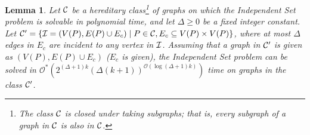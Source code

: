 \documentclass[11pt]{article}
\newtheorem{lemma}[theorem]{Lemma}
\newcommand{\Oh}{{\mathcal O}}
\newcommand{\Ohstar}{{\mathcal O^{*}}}
\begin{document}
\begin{lemma}\label{lem:separation}
Let ${\cal C}$ be a hereditary class\footnote{The class ${\cal C}$ is closed under taking subgraphs; that is, every subgraph of a graph in ${\cal C}$ is also in ${\cal C}$.} of graphs on which the {\sc Independent Set} problem is solvable in polynomial time, and let $\Delta \geq 0$ be a fixed integer constant. Let ${\cal C'} =  \{ {\cal I} = (V(P), E(P) \cup E_c) \mid P \in {\cal C} , E_c \subseteq V(P) \times V(P) \}$, where at most $\Delta$ edges in  $E_c$ are incident to any vertex in ${\cal I}$.  Assuming that a graph in ${\cal C'}$ is given as $(V(P), E(P) \cup E_c)$ ($E_c$ is given), the {\sc Independent Set} problem can be solved in $\Ohstar(2^{(\Delta + 1)k}(\Delta (k + 1))^{\Oh(\log(\Delta + 1)k)})$ time on graphs in the class ${\cal C'}$.
\end{lemma}
\end{document}
